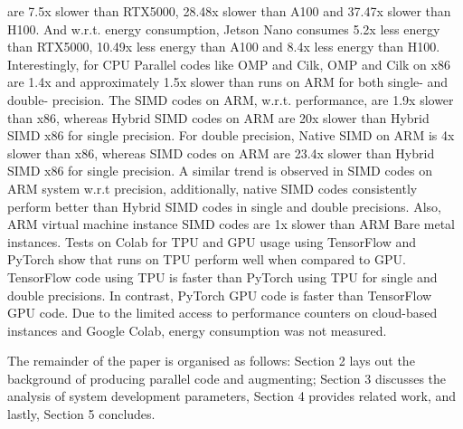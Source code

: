 are 7.5x slower than RTX5000, 28.48x slower than A100 and 37.47x slower than H100. And w.r.t. energy consumption, Jetson Nano consumes 5.2x less energy than RTX5000, 10.49x less energy than A100 and 8.4x less energy than H100. 
Interestingly, for CPU Parallel codes like OMP and Cilk, OMP and Cilk on x86 are 1.4x and approximately 1.5x slower than runs on ARM for both single- and double- precision.
The SIMD codes on ARM, w.r.t. performance, are 1.9x slower than x86, whereas Hybrid SIMD codes on ARM are 20x slower than Hybrid SIMD x86 for single precision.
For double precision, Native SIMD on ARM is 4x slower than x86, whereas SIMD codes on ARM are 23.4x slower than Hybrid SIMD x86 for single precision.
A similar trend is observed in SIMD codes on ARM system w.r.t precision, additionally, native SIMD codes consistently perform better than Hybrid SIMD codes in single and double precisions. 
Also, ARM virtual machine instance SIMD codes are 1x slower than ARM Bare metal instances.
Tests on Colab for TPU and GPU usage using TensorFlow and PyTorch show that runs on TPU perform well when compared to GPU. TensorFlow code using TPU is faster than PyTorch using TPU for single and double precisions. In contrast, PyTorch GPU code is faster than TensorFlow GPU code.
Due to the limited access to performance counters on cloud-based instances and Google Colab, energy consumption was not measured.

The remainder of the paper is organised as follows: Section 2 lays out the background of producing parallel code and augmenting; Section 3 discusses the analysis of system development parameters, Section 4 provides related work, and lastly, Section 5 concludes.